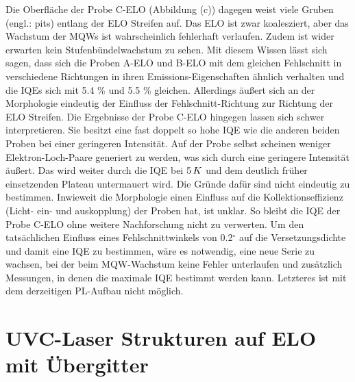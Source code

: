 \newline
Die Oberfläche der Probe C-ELO (Abbildung (c)) dagegen weist viele Gruben (engl.: pits) entlang der ELO Streifen auf. Das ELO ist zwar koalesziert, aber das Wachstum der MQWs ist wahrscheinlich fehlerhaft verlaufen. Zudem ist wider erwarten kein Stufenbündelwachstum zu sehen. Mit diesem Wissen lässt sich sagen, dass sich die Proben A-ELO und B-ELO mit dem gleichen Fehlschnitt in verschiedene Richtungen in ihren Emissions-Eigenschaften ähnlich verhalten und die IQEs sich mit 5.4 \% und 5.5 \% gleichen. Allerdings äußert sich an der Morphologie eindeutig der Einfluss der Fehlschnitt-Richtung zur Richtung der ELO Streifen.
\newline
Die Ergebnisse der Probe C-ELO hingegen lassen sich schwer interpretieren. Sie besitzt eine fast doppelt so hohe IQE wie die anderen beiden Proben bei einer geringeren Intensität. Auf der Probe selbst scheinen weniger Elektron-Loch-Paare generiert zu werden, was sich durch eine geringere Intensität äußert. Das wird weiter durch die IQE bei $5 \thinspace K$ und dem deutlich früher einsetzenden Plateau untermauert wird. Die Gründe dafür sind nicht eindeutig zu bestimmen. Inwieweit die Morphologie einen Einfluss auf die Kollektionseffizienz (Licht- ein- und auskopplung) der Proben hat, ist unklar.
\newline
So bleibt die IQE der Probe C-ELO ohne weitere Nachforschung nicht zu verwerten. Um den tatsächlichen Einfluss eines Fehlschnittwinkels von 0.2$^\circ$ auf die Versetzungsdichte und damit eine IQE zu bestimmen, wäre es notwendig, eine neue Serie zu wachsen, bei der beim MQW-Wachstum keine Fehler unterlaufen und zusätzlich Messungen, in denen die maximale IQE bestimmt werden kann. Letzteres ist mit dem derzeitigen PL-Aufbau nicht möglich.

\section{UVC-Laser Strukturen auf ELO mit Übergitter}

